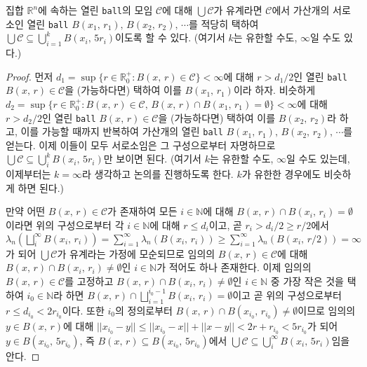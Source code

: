 \begin{lemma}
    집합 $\mathbb{R}^n$에 속하는 열린 \texttt{ball}의 모임 $\mathcal{C}$에 대해 $\bigcup\mathcal{C}$가 유계라면 $\mathcal{C}$에서 가산개의 서로소인 열린 \texttt{ball} $B(x_1,\,r_1),\,B(x_2,\,r_2),\,\cdots$를 적당히 택하여 $\bigcup\mathcal{C}\subseteq\bigcup_{i=1}^kB(x_i,\,5r_i)$이도록 할 수 있다. (여기서 $k$는 유한할 수도, $\infty$일 수도 있다.)
\end{lemma}

\begin{proof}
    먼저 $d_1=\sup\{r\in\mathbb{R}^+_0:B(x,\,r)\in\mathcal{C}\}<\infty$에 대해 $r>d_1/2$인 열린 \texttt{ball} $B(x,\,r)\in\mathcal{C}$을 (가능하다면) 택하여 이를 $B(x_1,\,r_1)$이라 하자. 비슷하게 $d_2=\sup\{r\in\mathbb{R}^+_0:B(x,\,r)\in\mathcal{C},\,B(x,\,r)\cap B(x_1,\,r_1)=\emptyset\}<\infty$에 대해 $r>d_2/2$인 열린 \texttt{ball} $B(x,\,r)\in\mathcal{C}$을 (가능하다면) 택하여 이를 $B(x_2,\,r_2)$라 하고, 이를 가능할 때까지 반복하여 가산개의 열린 \texttt{ball} $B(x_1,\,r_1),\,B(x_2,\,r_2),\,\cdots$를 얻는다. 이제 이들이 모두 서로소임은 그 구성으로부터 자명하므로 $\bigcup\mathcal{C}\subseteq\bigcup_i^kB(x_i,\,5r_i)$만 보이면 된다. (여기서 $k$는 유한할 수도, $\infty$일 수도 있는데, 이제부터는 $k=\infty$라 생각하고 논의를 진행하도록 한다. $k$가 유한한 경우에도 비슷하게 하면 된다.)

    만약 어떤 $B(x,\,r)\in\mathcal{C}$가 존재하여 모든 $i\in\mathbb{N}$에 대해 $B(x,\,r)\cap B(x_i,\,r_i)=\emptyset$이라면 위의 구성으로부터 각 $i\in\mathbb{N}$에 대해 $r\leq d_i$이고, 곧 $r_i>d_i/2\geq r/2$에서 $\lambda_n(\bigsqcup_i^\infty B(x_i,\,r_i))=\sum_{i=1}^\infty\lambda_n(B(x_i,\,r_i))\geq\sum_{i=1}^\infty\lambda_n(B(x_i,\,r/2))=\infty$가 되어 $\bigcup\mathcal{C}$가 유계라는 가정에 모순되므로 임의의 $B(x,\,r)\in\mathcal{C}$에 대해 $B(x,\,r)\cap B(x_i,\,r_i)\ne\emptyset$인 $i\in\mathbb{N}$가 적어도 하나 존재한다. 이제 임의의 $B(x,\,r)\in\mathcal{C}$를 고정하고 $B(x,\,r)\cap B(x_i,\,r_i)\ne\emptyset$인 $i\in\mathbb{N}$ 중 가장 작은 것을 택하여 $i_0\in\mathbb{N}$라 하면 $B(x,\,r)\cap\bigsqcup_{i=1}^{i_0-1}B(x_i,\,r_i)=\emptyset$이고 곧 위의 구성으로부터 $r\leq d_{i_0}<2r_{i_0}$이다. 또한 $i_0$의 정의로부터 $B(x,\,r)\cap B(x_{i_0},\,r_{i_0})\ne\emptyset$이므로 임의의 $y\in B(x,\,r)$에 대해 $||x_{i_0}-y||\leq||x_{i_0}-x||+||x-y||<2r+r_{i_0}<5r_{i_0}$가 되어 $y\in B(x_{i_0},\,5r_{i_0})$, 즉 $B(x,\,r)\subseteq B(x_{i_0},\,5r_{i_0})$에서 $\bigcup\mathcal{C}\subseteq\bigcup_i^\infty B(x_i,\,5r_i)$임을 안다.
\end{proof}

